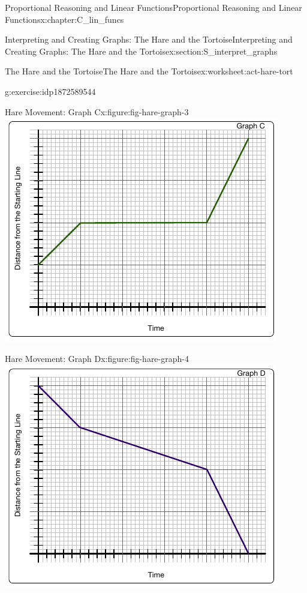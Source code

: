 \documentclass[oneside,10pt,]{book}
\numberwithin{equation}{chapter}
\begin{document}
\begin{chapterptx}{Proportional Reasoning and Linear Functions}{}{Proportional Reasoning and Linear Functions}{}{}{x:chapter:C_lin_funcs}
\begin{sectionptx}{Interpreting and Creating Graphs: The Hare and the Tortoise}{}{Interpreting and Creating Graphs: The Hare and the Tortoise}{}{}{x:section:S_interpret_graphs}
\begin{worksheet-subsection}{The Hare and the Tortoise}{}{The Hare and the Tortoise}{}{}{x:worksheet:act-hare-tort}
\begin{divisionexercise}{2}{}{}{g:exercise:idp1872589544}
\begin{sidebyside}{2}{0}{0}{0}%
\begin{sbspanel}{0.5}%
\begin{figureptx}{Hare Movement: Graph C}{x:figure:fig-hare-graph-3}{}%
\includegraphics[width=\linewidth]{external/hare-graph-3.pdf}
\tcblower
\end{figureptx}%
\end{sbspanel}%
\begin{sbspanel}{0.5}%
\begin{figureptx}{Hare Movement: Graph D}{x:figure:fig-hare-graph-4}{}%
\includegraphics[width=\linewidth]{external/hare-graph-4.pdf}

\end{figureptx}
\end{sbspanel}
\end{sidebyside}
\end{divisionexercise}
\end{worksheet-subsection}
\end{sectionptx}
\end{chapterptx}
\end{document}
